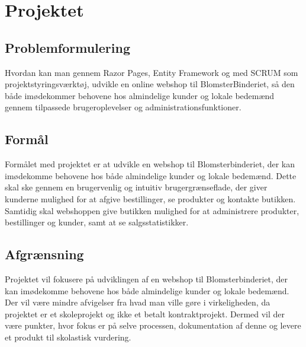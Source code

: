 \section{Projektet}

\subsection{Problemformulering}
Hvordan kan man gennem Razor Pages, Entity Framework og med SCRUM som projektstyringsværktøj, udvikle en online webshop til BlomsterBinderiet, 
så den både imødekommer behovene hos almindelige kunder og lokale bedemænd gennem tilpassede brugeroplevelser og administrationsfunktioner.

\subsection{Formål}
Formålet med projektet er at udvikle en webshop til Blomsterbinderiet, der kan imødekomme behovene hos både almindelige kunder og lokale bedemænd. 
Dette skal ske gennem en brugervenlig og intuitiv brugergrænseflade, der giver kunderne mulighed for at afgive bestillinger, se produkter og kontakte butikken. 
Samtidig skal webshoppen give butikken mulighed for at administrere produkter, bestillinger og kunder, samt at se salgsstatistikker.

\subsection{Afgrænsning}
Projektet vil fokusere på udviklingen af en webshop til Blomsterbinderiet, der kan imødekomme behovene hos både almindelige kunder og lokale bedemænd. 
Der vil være mindre afvigelser fra hvad man ville gøre i virkeligheden, da projektet er et skoleprojekt og ikke et betalt kontraktprojekt. 
Dermed vil der være punkter, hvor fokus er på selve processen, dokumentation af denne og levere et produkt til skolastisk vurdering.

